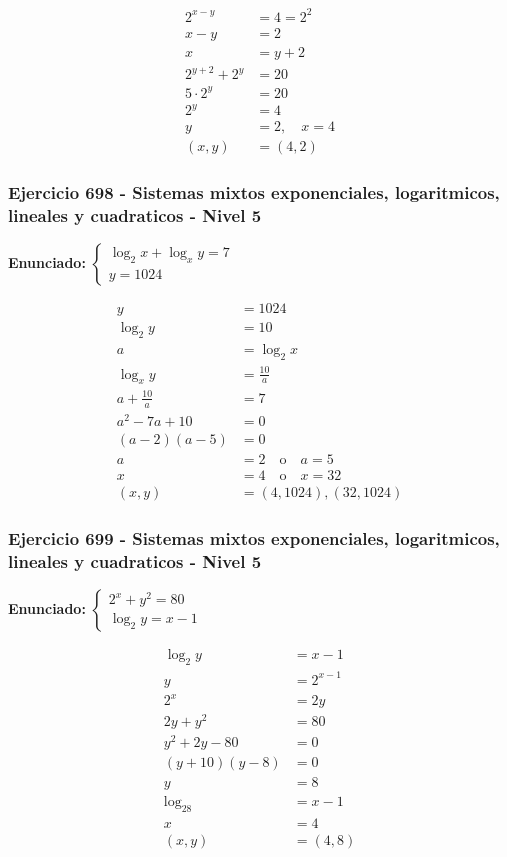 \documentclass[12pt,a4paper]{article}
\begin{document}
\[
\begin{aligned}
2^{x-y}&=4=2^2\\
x-y&=2\\
x&=y+2\\
2^{y+2}+2^y&=20\\
5\cdot2^y&=20\\
2^y&=4\\
y&=2,
\quad x=4\\
(x,y)&=\boxed{(4,2)}
\end{aligned}
\]


\subsubsection*{Ejercicio 698 - Sistemas mixtos exponenciales, logaritmicos, lineales y cuadraticos - Nivel 5}
\textbf{Enunciado:} \(\begin{cases}\log_2x+\log_xy=7\\ y=1024\end{cases}\)

\[
\begin{aligned}
y&=1024\\
\log_2y&=10\\
a&=\log_2x\\
\log_xy&=\frac{10}{a}\\
a+\frac{10}{a}&=7\\
a^2-7a+10&=0\\
(a-2)(a-5)&=0\\
a&=2\quad \text{o}\quad a=5\\
x&=4\quad \text{o}\quad x=32\\
(x,y)&=\boxed{(4,1024),(32,1024)}
\end{aligned}
\]


\subsubsection*{Ejercicio 699 - Sistemas mixtos exponenciales, logaritmicos, lineales y cuadraticos - Nivel 5}
\textbf{Enunciado:} \(\begin{cases}2^x+y^2=80\\ \log_2y=x-1\end{cases}\)

\[
\begin{aligned}
\log_2y&=x-1\\
y&=2^{x-1}\\
2^x&=2y\\
2y+y^2&=80\\
y^2+2y-80&=0\\
(y+10)(y-8)&=0\\
y&=8\\
\log_28&=x-1\\
x&=4\\
(x,y)&=\boxed{(4,8)}
\end{aligned}
\]
\end{document}
